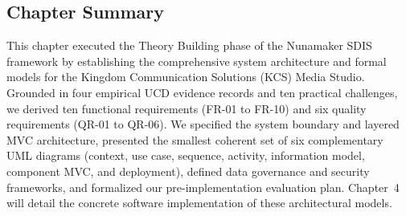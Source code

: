 \documentclass[a4paper,11pt]{article}
\begin{document}
\subsection{Chapter Summary}
\label{sec:chap3_summary}
This chapter executed the Theory Building phase of the Nunamaker SDIS framework by establishing the comprehensive system architecture and formal models for the Kingdom Communication Solutions (KCS) Media Studio. Grounded in four empirical UCD evidence records and ten practical challenges, we derived ten functional requirements (FR-01 to FR-10) and six quality requirements (QR-01 to QR-06). We specified the system boundary and layered MVC architecture, presented the smallest coherent set of six complementary UML diagrams (context, use case, sequence, activity, information model, component MVC, and deployment), defined data governance and security frameworks, and formalized our pre-implementation evaluation plan. Chapter~4 will detail the concrete software implementation of these architectural models.

\FloatBarrier
\clearpage

\nocite{*}
\printbibliography[heading=bibintoc]
\end{document}
